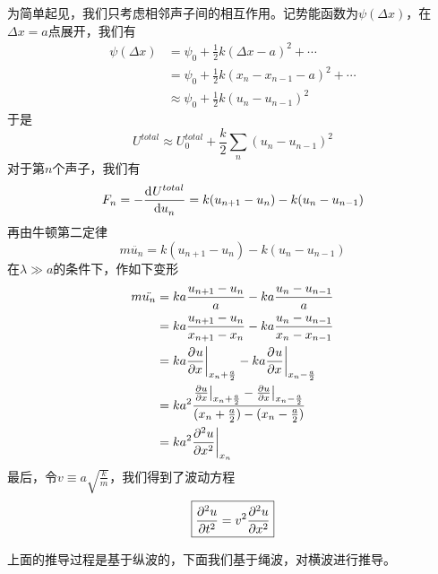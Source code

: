 为简单起见，我们只考虑相邻声子间的相互作用。记势能函数为$\psi(\Delta x)$，在$\Delta x=a$点展开，我们有
\[
    \begin{aligned}
        \psi(\Delta x) & =\psi_0+\frac{1}{2}k(\Delta x-a)^2+\cdots    \\
                       & =\psi_0+\frac{1}{2}k(x_n-x_{n-1}-a)^2+\cdots \\
                       & \approx \psi_0+\frac{1}{2}k(u_n-u_{n-1})^2
    \end{aligned}
\]
于是
\[U^{total}\approx U^{total}_0+\frac{k}{2}\sum \limits_{n}(u_n-u_{n-1})^2\]
对于第$n$个声子，我们有
\[F_n=-\D[]{U^{total}}{u_n}=k(u_{n+1}-u_n)-k(u_{n}-u_{n-1})\]
再由牛顿第二定律
\[m\ddot{u_n}=k(u_{n+1}-u_n)-k(u_{n}-u_{n-1})\]
在$\lambda \gg a$的条件下，作如下变形
\[
    \begin{aligned}
        m\ddot{u_n} & =ka\frac{u_{n+1}-u_n}{a}-ka\frac{u_{n}-u_{n-1}}{a}                                                                                                           \\
                    & =ka\frac{u_{n+1}-u_n}{x_{n+1}-x_{n}}-ka\frac{u_{n}-u_{n-1}}{x_n-x_{n-1}}                                                                                     \\
                    & =ka\Par[]{u}{x}\bigg |_{x_n+\frac{a}{2}}-ka\Par[]{u}{x}\bigg |_{x_n-\frac{a}{2}}                                                                             \\
                    & =ka^2\frac{\frac{\partial u}{\partial x} \big|_{x_n+\frac{a}{2}}-\frac{\partial u}{\partial x}\big |_{x_n-\frac{a}{2}}}{(x_n+\frac{a}{2})-(x_n-\frac{a}{2})} \\
                    & =ka^2\Par[2]{u}{x}\bigg |_{x_n}                                                                                                                              \\
    \end{aligned}
\]
最后，令$v\equiv a\sqrt{\frac{k}{m}}$，我们得到了波动方程
\[\boxed{\Par[2]{u}{t}=v^2\Par[2]{u}{x}}\]

上面的推导过程是基于纵波的，下面我们基于绳波，对横波进行推导。

